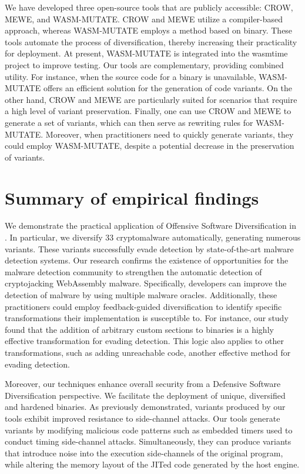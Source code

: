 We have developed three open-source tools that are publicly accessible: CROW, MEWE, and WASM-MUTATE. 
CROW and MEWE utilize a compiler-based approach, whereas WASM-MUTATE employs a method based on binary. 
These tools automate the process of diversification, thereby increasing their practicality for deployment. 
At present, WASM-MUTATE is integrated into the wasmtime project to improve testing. 
Our tools are complementary, providing combined utility. 
For instance, when the source code for a \Wasm binary is unavailable, WASM-MUTATE offers an efficient solution for the generation of code variants. 
On the other hand, CROW and MEWE are particularly suited for scenarios that require a high level of variant preservation.
Finally, one can use CROW and MEWE to generate a set of variants, which can then serve as rewriting rules for WASM-MUTATE. 
Moreover, when practitioners need to quickly generate variants, they could employ WASM-MUTATE, despite a potential decrease in the preservation of variants.



\section{Summary of empirical findings}

We demonstrate the practical application of Offensive Software Diversification in \Wasm.
In particular, we diversify 33 \Wasm cryptomalware automatically, generating numerous variants.
These variants successfully evade detection by state-of-the-art malware detection systems.
Our research confirms the existence of opportunities for the malware detection community to strengthen the automatic detection of cryptojacking WebAssembly malware.
Specifically, developers can improve the detection of \Wasm malware by using multiple malware oracles.
Additionally, these practitioners could employ feedback-guided diversification to identify specific transformations their implementation is susceptible to.
For instance, our study found that the addition of arbitrary custom sections to \Wasm binaries is a highly effective transformation for evading detection.
This logic also applies to other transformations, such as adding unreachable code, another effective method for evading detection.

Moreover, our techniques enhance overall security from a Defensive Software Diversification perspective.
We facilitate the deployment of unique, diversified and hardened \Wasm binaries.
As previously demonstrated, \Wasm variants produced by our tools exhibit improved resistance to side-channel attacks.
Our tools generate variants by modifying malicious code patterns such as embedded timers used to conduct timing side-channel attacks.
Simultaneously, they can produce variants that introduce noise into the execution side-channels of the original program, while altering the memory layout of the JITed code generated by the host engine.


